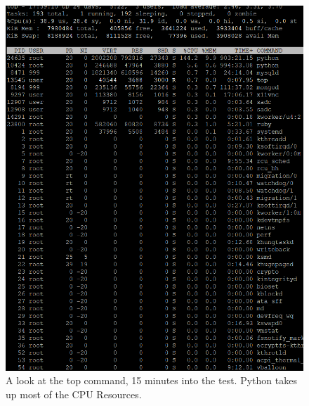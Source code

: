 \documentclass[12pt]{article}
\begin{document}
\newpage
\begin{figure}[h!]
	\centering
	\includegraphics[width=\textwidth,height=\textheight,keepaspectratio]{intro/S1_harshit.png}
	\caption{A look at the top command, 15 minutes into the test. Python takes up most of the CPU Resources.}
\end{figure}
\end{document}
